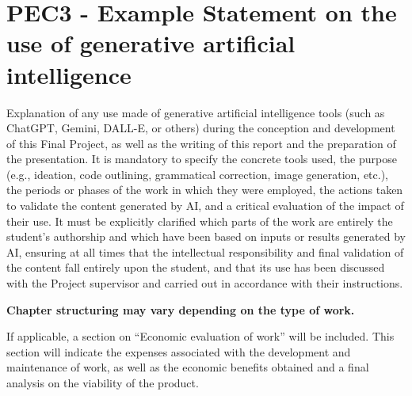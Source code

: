 \chapter{PEC3 - Example Statement on the use of generative artificial intelligence}

Explanation of any use made of generative artificial intelligence tools (such as ChatGPT, Gemini, DALL-E, or others) during the conception and development of this Final Project, as well as the writing of this report and the preparation of the presentation. It is mandatory to specify the concrete tools used, the purpose (e.g., ideation, code outlining, grammatical correction, image generation, etc.), the periods or phases of the work in which they were employed, the actions taken to validate the content generated by AI, and a critical evaluation of the impact of their use. It must be explicitly clarified which parts of the work are entirely the student's authorship and which have been based on inputs or results generated by AI, ensuring at all times that the intellectual responsibility and final validation of the content fall entirely upon the student, and that its use has been discussed with the Project supervisor and carried out in accordance with their instructions.


 
\textbf{Chapter structuring may vary depending on the type of work.}  
 
If applicable, a section on “Economic evaluation of work” will be included. This section will indicate the expenses associated with the development and maintenance of work, as well as the economic benefits obtained and a final analysis on the viability of the product.